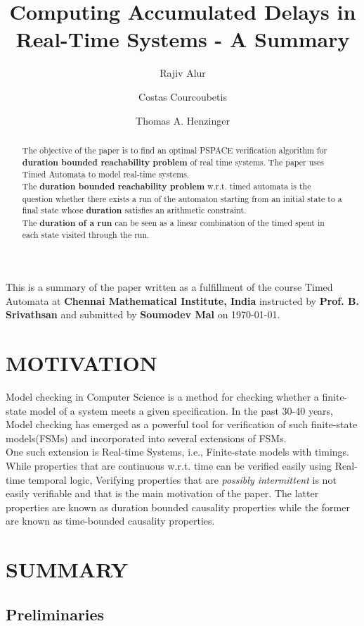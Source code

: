 \documentclass[a4paper,UKenglish,cleveref, autoref, thm-restate]{lipics-v2019}
\title{Computing Accumulated Delays in Real-Time Systems - A Summary} %
\author{Rajiv Alur}{University of Pennsylvania}{}{}{}
\author{Costas Courcoubetis}{Singapore University of Technology and Design}{}{}{}
\author{Thomas A. Henzinger}{IST Austria}{}{}{}
\begin{document}
\maketitle
\medskip
This is a summary of the paper written as a fulfillment of the course Timed Automata at\textbf{ Chennai Mathematical Institute, India} instructed by \textbf{Prof. B. Srivathsan} and submitted by \textbf{Soumodev Mal} on \today.

\begin{abstract}
The objective of the paper is to find an optimal PSPACE verification algorithm for \textbf{duration bounded reachability problem} of real time systems. The paper uses Timed Automata to model real-time systems.\\
The \textbf{duration bounded reachability problem} w.r.t. timed automata is the question whether there exists a run of the automaton starting from an initial state to a final state whose \textbf{duration} satisfies an arithmetic constraint.\\
The \textbf{duration of a run} can be seen as a linear combination of the timed spent in each state visited through the run.
\end{abstract}

\section{MOTIVATION}
\label{sec:mot}
Model checking in Computer Science is a method for checking whether a finite-state model of a system meets a given specification. In the past 30-40 years, Model checking has emerged as a powerful tool for verification of such finite-state models(FSMs) and incorporated into several extensions of FSMs.\\
One such extension is Real-time Systems, i.e., Finite-state models with timings.\\
While properties that are continuous w.r.t. time can be verified easily using Real-time temporal logic, Verifying properties that are \textit{possibly intermittent} is not easily verifiable and that is the main motivation of the paper. The latter properties are known as duration bounded causality properties while the former are known as time-bounded causality properties.
\section{SUMMARY}
\subsection{Preliminaries}
\end{document}
